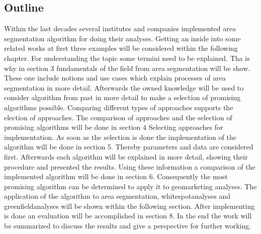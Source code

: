 \subsection{Outline}
Within the last decades several institutes and companies implemented area segmentation algorithm for doing their analyses. Getting an inside into some related works at first three examples will be considered within the following chapter. For understanding the topic some termini need to be explained. Tha is why in section 3 fundamentals of the field from area segmentation will be show. These one include notions and use cases which explain processes of area segmentation in more detail. Afterwards the owned knowledge will be used to consider algorithm from past in more detail to make a selection of promising algorithms possible. Comparing different types of approaches supports the election of approaches. The comparison of approaches and the selection of promising algorithms will be done in section 4 Selecting approaches for implementation. As soon as the selection is done the implementation of the algorithm will be done in section 5. Thereby parameters and data are considered first. Afterwards each algorithm will be explained in more detail, showing their procedure and presented the results. Using these information a comparison of the implemented algorithm will be done in section 6. Consequently the most promising algorithm can be determined to apply it to geomarketing analyses. The application of the algorithm to area segmentation, whitespotanalyses and greenfieldanalyses will be shown within the following section. After implementing is done an evaluation will be accomplished in section 8. In the end the work will be summarized to discuss the results and give a perspective for further working.